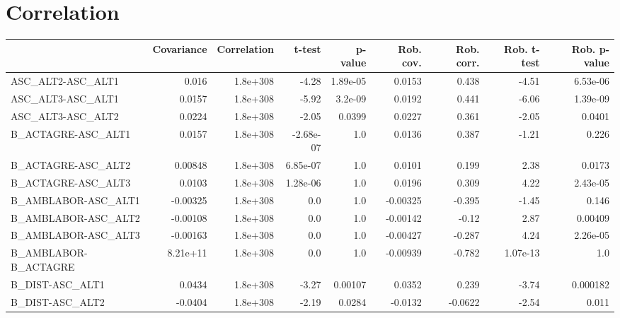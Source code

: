 \section{Correlation}
\begin{tabular}{lrrrrrrrr}
\toprule
{} &  Covariance &  Correlation &    t-test &  p-value &  Rob. cov. &  Rob. corr. &  Rob. t-test &  Rob. p-value \\
\midrule
ASC\_ALT2-ASC\_ALT1             &       0.016 &     1.8e+308 &     -4.28 & 1.89e-05 &     0.0153 &       0.438 &        -4.51 &      6.53e-06 \\
ASC\_ALT3-ASC\_ALT1             &      0.0157 &     1.8e+308 &     -5.92 &  3.2e-09 &     0.0192 &       0.441 &        -6.06 &      1.39e-09 \\
ASC\_ALT3-ASC\_ALT2             &      0.0224 &     1.8e+308 &     -2.05 &   0.0399 &     0.0227 &       0.361 &        -2.05 &        0.0401 \\
B\_ACTAGRE-ASC\_ALT1            &      0.0157 &     1.8e+308 & -2.68e-07 &      1.0 &     0.0136 &       0.387 &        -1.21 &         0.226 \\
B\_ACTAGRE-ASC\_ALT2            &     0.00848 &     1.8e+308 &  6.85e-07 &      1.0 &     0.0101 &       0.199 &         2.38 &        0.0173 \\
B\_ACTAGRE-ASC\_ALT3            &      0.0103 &     1.8e+308 &  1.28e-06 &      1.0 &     0.0196 &       0.309 &         4.22 &      2.43e-05 \\
B\_AMBLABOR-ASC\_ALT1           &    -0.00325 &     1.8e+308 &       0.0 &      1.0 &   -0.00325 &      -0.395 &        -1.45 &         0.146 \\
B\_AMBLABOR-ASC\_ALT2           &    -0.00108 &     1.8e+308 &       0.0 &      1.0 &   -0.00142 &       -0.12 &         2.87 &       0.00409 \\
B\_AMBLABOR-ASC\_ALT3           &    -0.00163 &     1.8e+308 &       0.0 &      1.0 &   -0.00427 &      -0.287 &         4.24 &      2.26e-05 \\
B\_AMBLABOR-B\_ACTAGRE          &    8.21e+11 &     1.8e+308 &       0.0 &      1.0 &   -0.00939 &      -0.782 &     1.07e-13 &           1.0 \\
B\_DIST-ASC\_ALT1               &      0.0434 &     1.8e+308 &     -3.27 &  0.00107 &     0.0352 &       0.239 &        -3.74 &      0.000182 \\
B\_DIST-ASC\_ALT2               &     -0.0404 &     1.8e+308 &     -2.19 &   0.0284 &    -0.0132 &     -0.0622 &        -2.54 &         0.011 \\

\end{tabular}
